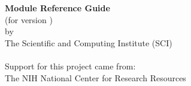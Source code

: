 %
% 
% 
% 
% 
% 
%

%

\begin{center}
  \vspace*{1.5in}
  {\huge\bf \sr{} Module Reference Guide}\\
  {(for \sr{} version \version{})} \\
  \vspace{0.75in}
  {\Large
    by \\
    The Scientific and Computing Institute (SCI)\\
    \\
    \vfill
    Support for this project came from:\\
    \smallskip
    The NIH National Center for Research Resources
    \vspace{0.5in}
  }
\end{center}

